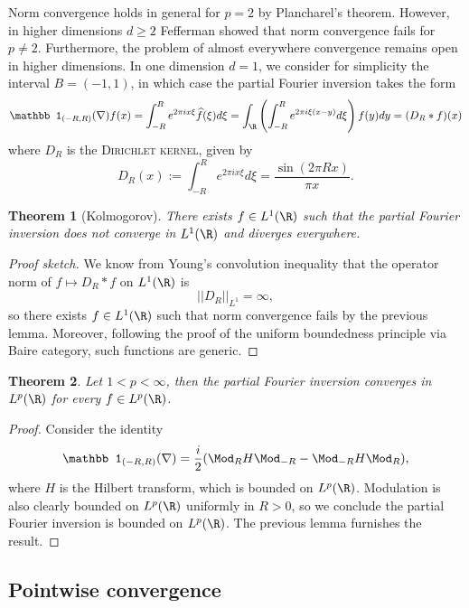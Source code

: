 \documentclass[reqno]{amsart}
\newtheorem{theorem}{Theorem}
\theoremstyle{definition}
\theoremstyle{remark}
\renewcommand{\emph}{\textsc}
\begin{document}
Norm convergence holds in general for $p = 2$ by Plancharel's theorem. However, in higher dimensions $d \geq 2$ Fefferman showed that norm convergence fails for $p \neq 2$. Furthermore, the problem of almost everywhere convergence remains open in higher dimensions. In one dimension $d = 1$, we consider for simplicity the interval $B = (-1, 1)$, in which case the partial Fourier inversion takes the form
	\[ \mathbb 1_{(-R, R)} (\nabla) f (x) = \int_{-R}^R e^{2\pi i x \xi} \widehat f(\xi) d\xi = \int_\R\left( \int_{-R}^R e^{2\pi i \xi (x - y)}  d\xi \right) f(y) dy = (D_R * f)(x) \]
where	 $D_R$ is the \emph{Dirichlet kernel}, given by
	\[ D_R (x) := \int_{-R}^R e^{2\pi i x \xi} d \xi = \frac{\sin(2\pi R x)}{\pi x}. \]
\begin{theorem}[Kolmogorov]
	There exists $f \in L^1 (\R)$ such that the partial Fourier inversion does not converge in $L^1 (\R)$ and diverges everywhere.  
\end{theorem}

\begin{proof}[Proof sketch]
	We know from Young's convolution inequality that the operator norm of $f \mapsto D_R * f$ on $L^1 (\R)$ is 
		\[ ||D_R||_{L^1} = \infty, \]
	so there exists $f \in L^1 (\R)$ such that norm convergence fails by the previous lemma. Moreover, following the proof of the uniform boundedness principle via Baire category, such functions are generic. 
\end{proof}

\begin{theorem}
	Let $1 < p < \infty$, then the partial Fourier inversion converges in $L^p(\R)$ for every $f \in L^p (\R)$.
\end{theorem}

\begin{proof}
	Consider the identity
		\[ \mathbb 1_{(-R, R)} (\nabla)  = \frac{i}{2} (\Mod_R H \Mod_{-R} - \Mod_{-R} H \Mod_R ),  \]
	where $H$ is the Hilbert transform, which is bounded on $L^p (\R)$. Modulation is also clearly bounded on $L^p (\R)$ uniformly in $R > 0$, so we conclude the partial Fourier inversion is bounded on $L^p (\R)$. The previous lemma furnishes the result.
\end{proof}

\subsection{Pointwise convergence}
\end{document}
